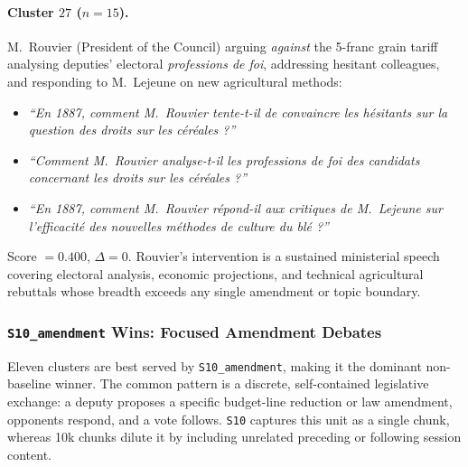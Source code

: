 \paragraph{Cluster $27$ ($n=15$).}
M.~Rouvier (President of the Council) arguing \emph{against} the 5-franc grain
tariff analysing deputies' electoral \emph{professions de foi}, addressing
hesitant colleagues, and responding to M.~Lejeune on new agricultural methods:
\begin{itemize}
  \item \textit{``En 1887, comment M.~Rouvier tente-t-il de convaincre les
    h\'{e}sitants sur la question des droits sur les c\'{e}r\'{e}ales ?''}
  \item \textit{``Comment M.~Rouvier analyse-t-il les professions de foi des
    candidats concernant les droits sur les c\'{e}r\'{e}ales ?''}
  \item \textit{``En 1887, comment M.~Rouvier r\'{e}pond-il aux critiques de
    M.~Lejeune sur l'efficacit\'{e} des nouvelles m\'{e}thodes de culture du
    bl\'{e} ?''}
\end{itemize}
Score $= 0.400$, $\Delta = 0$.
Rouvier's intervention is a sustained ministerial speech covering electoral
analysis, economic projections, and technical agricultural rebuttals whose
breadth exceeds any single amendment or topic boundary.

\subsubsection{\texttt{S10\_amendment} Wins: Focused Amendment Debates}
\label{sec:s10-clusters}

Eleven clusters are best served by \texttt{S10\_amendment}, making it the
dominant non-baseline winner.
The common pattern is a discrete, self-contained legislative exchange: a deputy
proposes a specific budget-line reduction or law amendment, opponents respond,
and a vote follows.
\texttt{S10} captures this unit as a single chunk, whereas 10k chunks dilute it
by including unrelated preceding or following session content.

